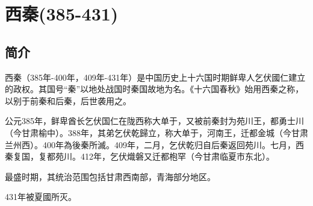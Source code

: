 

\section{西秦\tiny(385-431)}

\subsection{简介}

西秦（385年-400年，409年-431年）是中国历史上十六国时期鲜卑人乞伏國仁建立的政权。其国号“秦”以地处战国时秦国故地为名。《十六国春秋》始用西秦之称，以别于前秦和后秦，后世袭用之。

公元385年，鲜卑酋长乞伏国仁在陇西称大单于，又被前秦封为苑川王，都勇士川（今甘肃榆中）。388年，其弟乞伏乾歸立，称大单于，河南王，迁都金城（今甘肃兰州西）。400年為後秦所滅。409年，二月，乞伏乾归自后秦返回苑川。七月，西秦复国，复都苑川。412年，乞伏熾磐又迁都枹罕（今甘肃临夏市东北）。

最盛时期，其统治范围包括甘肃西南部，青海部分地区。

431年被夏國所灭。






